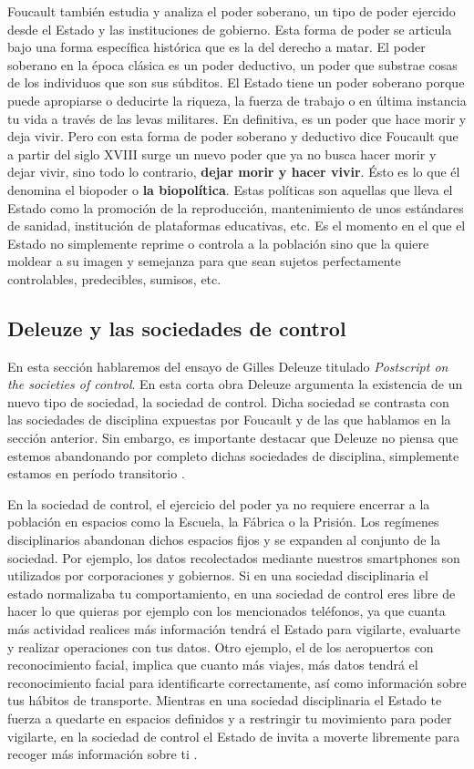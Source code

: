 \documentclass[11pt]{article}
\begin{document}
Foucault también estudia y analiza el poder soberano, un tipo de poder ejercido desde el Estado y las instituciones de gobierno. Esta forma de poder se articula bajo una forma específica histórica que es la del derecho a matar. El poder soberano en la época clásica es un poder deductivo, un poder que substrae cosas de los individuos que son sus súbditos. El Estado tiene un poder soberano porque puede apropiarse o deducirte la riqueza, la fuerza de trabajo o en última instancia tu vida a través de las levas militares. En definitiva, es un poder que hace morir y deja vivir. Pero con esta forma de poder soberano y deductivo dice Foucault que a partir del siglo XVIII surge un nuevo poder que ya no busca hacer morir y dejar vivir, sino todo lo contrario, \textbf{dejar morir y hacer vivir}. Ésto es lo que él denomina el biopoder o \textbf{la biopolítica}. Estas políticas son aquellas que lleva el Estado como la promoción de la reproducción, mantenimiento de unos estándares de sanidad, institución de plataformas educativas, etc. Es el momento en el que el Estado no simplemente reprime o controla a la población sino que la quiere moldear a su imagen y semejanza para que sean sujetos perfectamente controlables, predecibles, sumisos, etc.
\subsection{Deleuze y las sociedades de control}
En esta sección hablaremos del ensayo de Gilles Deleuze titulado \textit{Postscript on the societies of control}. En esta corta obra Deleuze argumenta la existencia de un nuevo tipo de sociedad, la sociedad de control. Dicha sociedad se contrasta con las sociedades de disciplina expuestas por Foucault y de las que hablamos en la sección anterior. Sin embargo, es importante destacar que Deleuze no piensa que estemos abandonando por completo dichas sociedades de disciplina, simplemente estamos en período transitorio \cite{cp-societies}.

En la sociedad de control, el ejercicio del poder ya no requiere encerrar a la población en espacios como la Escuela, la Fábrica o la Prisión. Los regímenes disciplinarios abandonan dichos espacios fijos y se expanden al conjunto de la sociedad. Por ejemplo, los datos recolectados mediante nuestros smartphones son utilizados por corporaciones y gobiernos. Si en una sociedad disciplinaria el estado normalizaba tu comportamiento, en una sociedad de control eres libre de hacer lo que quieras por ejemplo con los mencionados teléfonos, ya que cuanta más actividad realices más información tendrá el Estado para vigilarte, evaluarte y realizar operaciones con tus datos. Otro ejemplo, el de los aeropuertos con reconocimiento facial, implica que cuanto más viajes, más datos tendrá el reconocimiento facial para identificarte correctamente, así como información sobre tus hábitos de transporte. Mientras en una sociedad disciplinaria el Estado te fuerza a quedarte en espacios definidos y a restringir tu movimiento para poder vigilarte, en la sociedad de control el Estado de invita a moverte libremente para recoger más información sobre ti \cite{cp-societies}.
\end{document}
